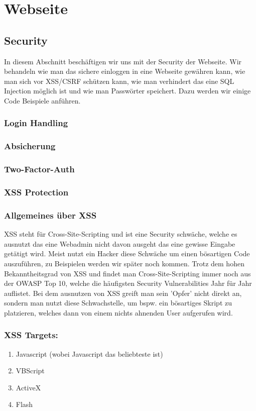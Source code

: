 
\section{Webseite}
\label{sec:Webseite}
\subsection{Security}
\label{sec:Security}
In diesem Abschnitt beschäftigen wir uns mit der Security der Webseite.
Wir behandeln wie man das sichere einloggen in eine Webseite gewähren kann, 
wie man sich vor XSS/CSRF schützen kann, wie man verhindert das eine SQL Injection
möglich ist und wie man Passwörter speichert. Dazu werden wir einige Code Beispiele anführen.

\subsubsection{Login Handling}
\label{sec:Login}
\subsubsection{Absicherung}
\label{sec:Absicherung}
\subsubsection{Two-Factor-Auth}
\label{sec:tfa}
\subsubsection{XSS Protection}
\label{sec:xss}
\subsubsection{Allgemeines über XSS}
XSS steht für Cross-Site-Scripting und ist eine Security schwäche, welche es ausnutzt das eine Webadmin nicht davon ausgeht das eine gewisse Eingabe getätigt wird. Meist nutzt ein Hacker diese Schwäche um einen bösartigen Code auszuführen, zu Beispielen werden wir später noch kommen. Trotz dem hohen Bekanntheitsgrad von XSS und findet man Cross-Site-Scripting immer noch aus der OWASP Top 10, welche die häufigsten Security Vulnerabilities Jahr für Jahr auflistet. Bei dem ausnutzen von XSS greift man sein 'Opfer' nicht direkt an, sondern man nutzt diese Schwachstelle, um bspw. ein bösartiges Skript zu platzieren, welches dann von einem nichts ahnenden User aufgerufen wird. 
\subsubsection{XSS Targets:}
\begin{enumerate}
\item Javascript (wobei Javascript das beliebteste ist) 
\item VBScript 
\item ActiveX
\item Flash
\end{enumerate}
